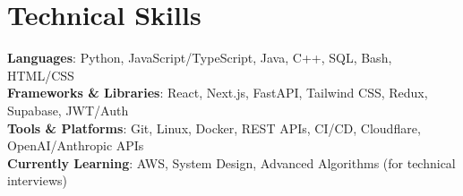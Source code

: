 \documentclass[letterpaper,11pt]{article}
\begin{document}
%
\section{Technical Skills}
\begin{itemize}[leftmargin=0.15in, label={}]
  \small{\item{
        \textbf{Languages}{: Python, JavaScript/TypeScript, Java, C++, SQL, Bash, HTML/CSS
        } \\
        \textbf{Frameworks \& Libraries}{: React, Next.js, FastAPI, Tailwind CSS, Redux, Supabase, JWT/Auth} \\
        \textbf{Tools \& Platforms}{: Git, Linux, Docker, REST APIs, CI/CD, Cloudflare, OpenAI/Anthropic APIs} \\
        \textbf{Currently Learning}{: AWS, System Design, Advanced Algorithms (for technical interviews)}
        }}
\end{itemize}

\end{document}
